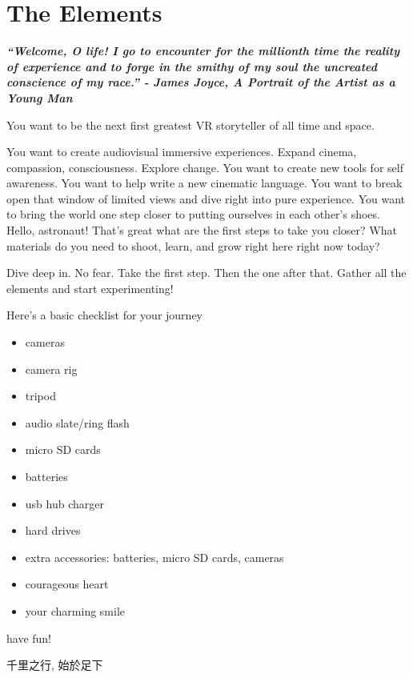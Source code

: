 \chapter{The Elements}
\pagecolor{white}
\label{chap:1}
\begin{fullwidth}

{\itshape\bfseries “Welcome, O life! I go to encounter for the millionth time the reality of experience and to forge in the smithy of my soul the uncreated conscience of my race.”
- James Joyce, A Portrait of the Artist as a Young Man
}

\vspace{\baselineskip}

\problem

{\large You want to be the next first greatest VR storyteller of all time and space. \par}

You want to create audiovisual immersive experiences. Expand cinema, compassion, consciousness. Explore change. You want to create new tools for self awareness. You want to help write a new cinematic language. You want to break open that window of limited views and dive right into pure experience. You want to bring the world one step closer to putting ourselves in each other’s shoes. Hello, astronaut! That’s great what are the first steps to take you closer? What materials do you need to shoot, learn, and grow right here right now today?

\solution

{\large Dive deep in. No fear. Take the first step. Then the one after that. Gather all the elements and start experimenting! \par}

Here’s a basic checklist for your journey

\begin{itemize}
\item cameras
\item camera rig
\item tripod
\item audio slate/ring flash
\item micro SD cards
\item batteries
\item usb hub charger
\item hard drives
\item extra accessories: batteries, micro SD cards, cameras
\item courageous heart
\item your charming smile
\end{itemize}
                
have fun!

\begin{CJK*}{UTF8}{gbsn}
千里之行, 始於足下
\clearpage\end{CJK*}

\clearpage
\end{fullwidth}
